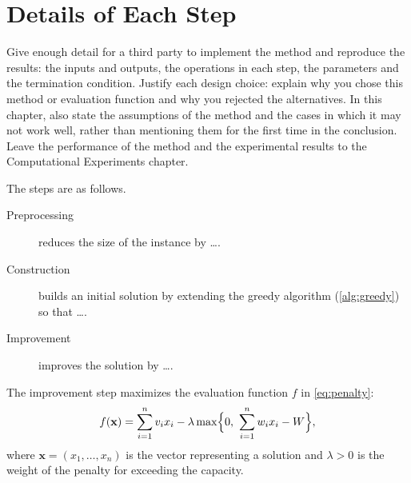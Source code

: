 \section{Details of Each Step}
\label{sec:procedure}

\begin{writingnote}
Give enough detail for a third party to implement the method and reproduce the results:
the inputs and outputs, the operations in each step, the parameters and the termination condition.
Justify each design choice: explain why you chose this method or evaluation function and why you rejected the alternatives.
In this chapter, also state the assumptions of the method and the cases in which it may not work well,
rather than mentioning them for the first time in the conclusion.
Leave the performance of the method and the experimental results to the Computational Experiments chapter.
\end{writingnote}

The steps are as follows.
\begin{description}
  \item[Preprocessing] reduces the size of the instance by \ldots.
  \item[Construction] builds an initial solution by extending the greedy algorithm (\cref{alg:greedy}) so that \ldots.
  \item[Improvement] improves the solution by \ldots.
\end{description}

The improvement step maximizes the evaluation function $f$ in \cref{eq:penalty}:
\begin{equation}
  f(\mathbf{x}) = \sum_{i=1}^{n} v_i x_i - \lambda \max\Bigl\{ 0,\ \sum_{i=1}^{n} w_i x_i - W \Bigr\},
  \label{eq:penalty}
\end{equation}
where $\mathbf{x} = (x_1, \dots, x_n)$ is the vector representing a solution
and $\lambda > 0$ is the weight of the penalty for exceeding the capacity.
